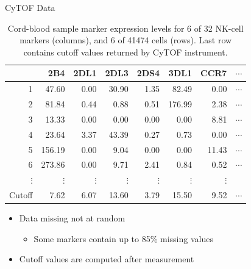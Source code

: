 \documentclass[ignorenonframetext,]{beamer}
\providecommand{\tightlist}{%
  \setlength{\itemsep}{0pt}\setlength{\parskip}{0pt}}
\begin{document}
\begin{frame}{CyTOF Data}

\begin{table}
\begin{tabular}{r|rrrrrrr}
  \hline
  & 2B4 & 2DL1 & 2DL3 & 2DS4 & 3DL1 & CCR7 & $\cdots$ \\
  \hline
  1 & 47.60 & 0.00 & 30.90 & 1.35 & 82.49 & 0.00 & $\cdots$ \\
  2 & 81.84 & 0.44 & 0.88 & 0.51 & 176.99 & 2.38 & $\cdots$ \\
  3 & 13.33 & 0.00 & 0.00 & 0.00 & 0.00 & 8.81   & $\cdots$ \\
  4 & 23.64 & 3.37 & 43.39 & 0.27 & 0.73 & 0.00  & $\cdots$ \\
  5 & 156.19 & 0.00 & 9.04 & 0.00 & 0.00 & 11.43 & $\cdots$ \\
  6 & 273.86 & 0.00 & 9.71 & 2.41 & 0.84 & 0.52  & $\cdots$ \\
  $\vdots$ & $\vdots$& $\vdots$& $\vdots$& $\vdots$& $\vdots$& $\vdots$& \\
  \hline
  Cutoff & 7.62 & 6.07 & 13.60 & 3.79 & 15.50 & 9.52 & $\cdots$\\
  \hline
\end{tabular}
\caption{Cord-blood sample marker expression levels for 6 of 32 NK-cell markers
(columns), and 6 of 41474 cells (rows). Last row contains cutoff values
returned by CyTOF instrument.}
\end{table}

\begin{itemize}
\tightlist
\item
  Data missing not at random

  \begin{itemize}
  \tightlist
  \item
    Some markers contain up to 85\% missing values
  \end{itemize}
\item
  Cutoff values are computed after measurement
\end{itemize}

\end{frame}
\end{document}
